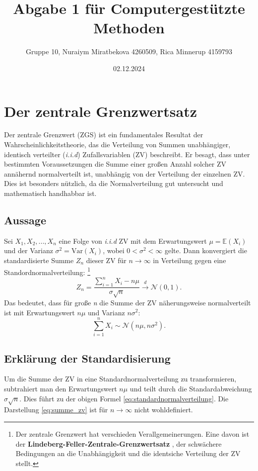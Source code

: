 \documentclass[11pt]{article}
\title{Abgabe 1 für Computergestützte Methoden}
\author{Gruppe 10, Nuraiym Miratbekova 4260509, Rica Minnerup 4159793}
\date{02.12.2024}
\begin{document}
\maketitle
\tableofcontents
\newpage

\section{Der zentrale Grenzwertsatz}
Der zentrale Grenzwert (ZGS) ist ein fundamentales Resultat der Wahrscheinlichkeitstheorie, das die Verteilung von Summen unabhängiger, identisch verteilter (\textit{i.i.d}) Zufallsvariablen (ZV) beschreibt. Er besagt, dass unter bestimmten Voraussetzungen die Summe einer großen Anzahl solcher ZV annähernd normalverteilt ist, unabhängig von der Verteilung der einzelnen ZV. Dies ist besonders nützlich, da die Normalverteilung gut untersucht und mathematisch handhabbar ist.

\subsection{Aussage}
Sei $X_1, X_2, ..., X_n$ eine Folge von \textit{i.i.d} ZV mit dem Erwartungswert \( \mu = \mathbb{E} (X_i)\) und der Varianz $\sigma^2 = \mathrm{Var}(X_i)$, wobei \(0 < \sigma^2 < \infty \) gelte. Dann konvergiert die standardisierte Summe $Z_n$ dieser ZV für \( n \xrightarrow{}\infty\) in Verteilung gegen eine Standordnormalverteilung: \footnote{Der zentrale Grenzwert hat verschieden Verallgemeinerungen. Eine davon ist der \textbf{Lindeberg-Feller-Zentrale-Grenzwertsatz} \cite[Seite 328]{klenke}, der schwächere Bedingungen an die Unabhängigkeit und die identsiche Verteilung der ZV stellt.}
\begin{equation}
    \label{eq:standardnormalverteilung}
    Z_n = \frac{\sum_{i=1}^n X_i - n \mu}{\sigma\sqrt{n}} \xrightarrow{d} \mathcal{N} (0,1).
\end{equation}
Das bedeutet, dass für große \textit{n} die Summe der ZV näherungsweise normalverteilt ist mit Erwartungswert \(n \mu\) und Varianz \(n\sigma^2\):
\begin{equation}
    \label{eq:summe_zv}
    \sum_{i=1}^n X_i \sim \mathcal{N}(n\mu, n\sigma^2).
\end{equation}

\subsection{Erklärung der Standardisierung}
Um die Summe der ZV in eine Standardnormalverteilung zu transformieren, subtrahiert man den Erwartungswert \(n\mu\) und teilt durch die Standardabweichung \(\sigma \sqrt{n}\). Dies führt zu der obigen Formel \eqref{eq:standardnormalverteilung}. Die Darstellung \eqref{eq:summe_zv} ist für \(n \xrightarrow{} \infty\) nicht wohldefiniert.
\end{document}

